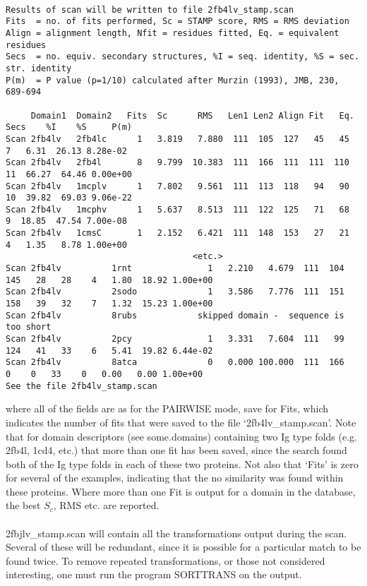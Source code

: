 \begin{scriptsize}\begin{verbatim}

Results of scan will be written to file 2fb4lv_stamp.scan
Fits  = no. of fits performed, Sc = STAMP score, RMS = RMS deviation
Align = alignment length, Nfit = residues fitted, Eq. = equivalent residues
Secs  = no. equiv. secondary structures, %I = seq. identity, %S = sec. str. identity
P(m)  = P value (p=1/10) calculated after Murzin (1993), JMB, 230, 689-694

     Domain1  Domain2   Fits  Sc      RMS   Len1 Len2 Align Fit   Eq. Secs    %I    %S     P(m)
Scan 2fb4lv   2fb4lc      1   3.819   7.880  111  105  127   45   45    7   6.31  26.13 8.28e-02 
Scan 2fb4lv   2fb4l       8   9.799  10.383  111  166  111  111  110   11  66.27  64.46 0.00e+00 
Scan 2fb4lv   1mcplv      1   7.802   9.561  111  113  118   94   90   10  39.82  69.03 9.06e-22 
Scan 2fb4lv   1mcphv      1   5.637   8.513  111  122  125   71   68    9  18.85  47.54 7.00e-08 
Scan 2fb4lv   1cmsC       1   2.152   6.421  111  148  153   27   21    4   1.35   8.78 1.00e+00 
                                     <etc.>
Scan 2fb4lv          1rnt               1   2.210   4.679  111  104  145   28   28    4   1.80  18.92 1.00e+00 
Scan 2fb4lv          2sodo              1   3.586   7.776  111  151  158   39   32    7   1.32  15.23 1.00e+00 
Scan 2fb4lv          8rubs            skipped domain -  sequence is too short
Scan 2fb4lv          2pcy               1   3.331   7.604  111   99  124   41   33    6   5.41  19.82 6.44e-02 
Scan 2fb4lv          8atca              0   0.000 100.000  111  166    0    0   33    0   0.00   0.00 1.00e+00 
See the file 2fb4lv_stamp.scan

\end{verbatim} \end{scriptsize}

where all of the fields are as for the PAIRWISE mode, save for Fits, which indicates the 
number of fits that were saved to the file `2fb4lv\_stamp.scan'.  Note that for domain descriptors 
(see some.domains) containing two Ig type folds (e.g. 2fb4l, 1cd4, etc.) that more than
one fit has been saved, since the search found both of the Ig type folds in each of
these two proteins.  Not also that `Fits' is zero for several of the examples,
indicating that the no similarity was found within these proteins.  Where more than one
Fit is output for a domain in the database, the best $S_{c}$, RMS etc. are reported.\\
\\
2fbjlv\_stamp.scan will contain all the transformations output during
the scan.  Several of these will be redundant, since it is possible for a 
particular match to be found twice.  To remove repeated 
transformations, or those not considered interesting, one must run
the program SORTTRANS on the output.\\

